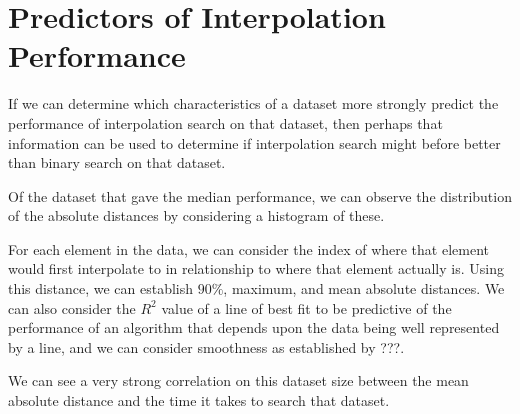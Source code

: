 \documentclass[twocolumn]{article}
\begin{document}
\section{Predictors of Interpolation Performance}
If we can determine which characteristics of a dataset more strongly predict the performance of interpolation search on that dataset, then perhaps that information can be used to determine if interpolation search might before better than binary search on that dataset.

Of the dataset that gave the median performance, we can observe the distribution of the absolute distances by considering a histogram of these.

\begin{figure}
\end{figure}


For each element in the data, we can consider the index of where that element would first interpolate to in relationship to where that element actually is. Using this distance, we can establish $90\%$, maximum, and mean absolute distances. We can also consider the $R^2$ value of a line of best fit to be predictive of the performance of an algorithm that depends upon the data being well represented by a line, and we can consider smoothness as established by ???.


We can see a very strong correlation on this dataset size between the mean absolute distance and the time it takes to search that dataset.


\begin{figure}[t]
\end{figure}

\begin{figure}[t]
\end{figure}
\end{document}
